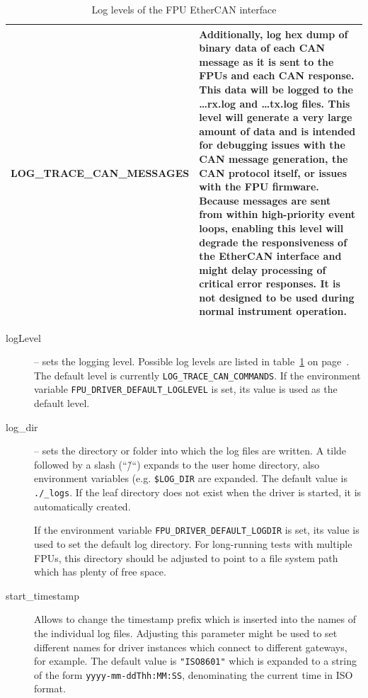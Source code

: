 \documentclass[fontsize=12,a4paper]{scrreprt}
\begin{document}
\begin{table}
\begin{centering}
\begin{tabular}{|l|p{}|}
    \hline LOG\_TRACE\_CAN\_MESSAGES & Additionally, log hex dump of
    binary data of each CAN message as it is sent to the FPUs and each
    CAN response. This data will be logged to the \ldots{}rx.log and
    \ldots{}tx.log files. This level will generate a very large amount
    of data and is intended for debugging issues with the CAN message
    generation, the CAN protocol itself, or issues with the FPU
    firmware. Because messages are sent from within high-priority
    event loops, enabling this level will degrade the responsiveness
    of the EtherCAN interface and might delay processing of critical error
    responses. It is not designed to be used during normal instrument
    operation. \\


  \hline
\end{tabular}
\end{centering}
\caption{Log levels of the FPU EtherCAN interface}
\label{tab:loglevels}
\end{table}


\begin{description}
\item[logLevel] -- sets the logging level. Possible log levels are
  listed in table~\ref{tab:loglevels} on
  page~\pageref{tab:loglevels}. The default level is currently
  \texttt{LOG\_TRACE\_CAN\_COMMANDS}. If the environment variable
  \texttt{FPU\_DRIVER\_DEFAULT\_LOGLEVEL} is set, its value is used as
  the default level.

  \item [log\_dir] -- sets the directory or folder into which the log
    files are written. A tilde followed by a slash (``\~/``) expands
    to the user home directory, also environment variables
    (e.g. \texttt{\$LOG\_DIR} are expanded. The default value is
    \texttt{./\_logs}. If the leaf directory does not exist when the
    driver is started, it is automatically created.

    If the environment variable \texttt{FPU\_DRIVER\_DEFAULT\_LOGDIR}
    is set, its value is used to set the default log directory.  For
    long-running tests with multiple FPUs, this directory should be
    adjusted to point to a file system path which has plenty of free
    space.

  \item[start\_timestamp] Allows to change the timestamp prefix which
    is inserted into the names of the individual log files.  Adjusting
    this parameter might be used to set different names for driver
    instances which connect to different gateways, for example.  The
    default value is \verb+"ISO8601"+ which is expanded to a string of
    the form \verb+yyyy-mm-ddThh:MM:SS+, denominating the current time
    in ISO format.

\end{description}
\end{document}
